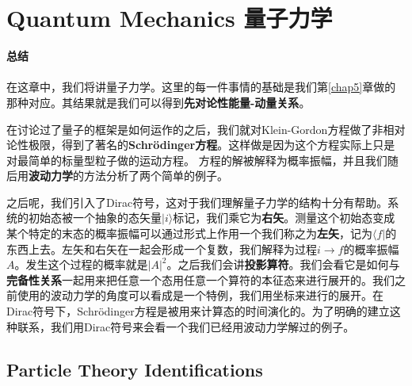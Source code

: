 


\chapter[量子力学]{Quantum Mechanics 量子力学}\label{chap8}

{\Huge\bf 总结\\ \ \\}
在这章中，我们将讲量子力学。这里的每一件事情的基础是我们第\ref{chap5}章做的那种对应。其结果就是我们可以得到{\bf 先对论性能量-动量关系}。

在讨论过了量子的框架是如何运作的之后，我们就对Klein-Gordon方程做了非相对论性极限，得到了著名的{\bf Schrödinger方程}。这样做是因为这个方程实际上只是对最简单的标量型粒子做的运动方程。
方程的解被解释为概率振幅，并且我们随后用{\bf 波动力学}的方法分析了两个简单的例子。

之后呢，我们引入了{Dirac符号}，这对于我们理解量子力学的结构十分有帮助。系统的初始态被一个抽象的态矢量$|i\rangle$标记，我们乘它为{\bf 右矢}。测量这个初始态变成某个特定的末态的概率振幅可以通过形式上作用一个我们称之为{\bf 左矢}，记为$\langle f|$的东西上去。左矢和右矢在一起会形成一个复数，我们解释为过程$i\to f$的概率振幅$A$。发生这个过程的概率就是$|A|^2$。之后我们会讲{\bf 投影算符}。我们会看它是如何与{\bf 完备性关系}一起用来把任意一个态用任意一个算符的本征态来进行展开的。我们之前使用的波动力学的角度可以看成是一个特例，我们用坐标来进行的展开。在Dirac符号下，Schrödinger方程是被用来计算态的时间演化的。为了明确的建立这种联系，我们用Dirac符号来会看一个我们已经用波动力学解过的例子。

\section[]{Particle Theory Identifications }

